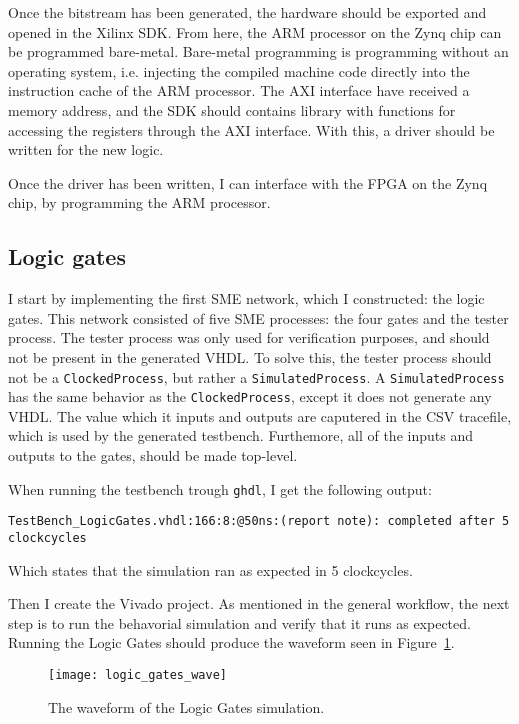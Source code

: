 Once the bitstream has been generated, the hardware should be exported and
opened in the Xilinx SDK. From here, the ARM processor on the Zynq chip can be
programmed bare-metal. Bare-metal programming is programming without an
operating system, i.e. injecting the compiled machine code directly into the
instruction cache of the ARM processor. The AXI interface have received a
memory address, and the SDK should contains library with functions for
accessing the registers through the AXI interface. With this, a driver should
be written for the new logic.

Once the driver has been written, I can interface with the FPGA on the Zynq
chip, by programming the ARM processor.

\subsection{Logic gates}
I start by implementing the first SME network, which I constructed: the logic
gates. This network consisted of five SME processes: the four gates and the
tester process. The tester process was only used for verification purposes, and
should not be present in the generated VHDL. To solve this, the tester process
should not be a \texttt{ClockedProcess}, but rather a
\texttt{SimulatedProcess}. A \texttt{SimulatedProcess} has the same behavior as
the \texttt{ClockedProcess}, except it does not generate any VHDL. The value
which it inputs and outputs are caputered in the CSV tracefile, which is used
by the generated testbench. Furthemore, all of the inputs and outputs to the
gates, should be made top-level.

When running the testbench trough \texttt{ghdl}, I get the following
output:
\begin{lstlisting}
TestBench_LogicGates.vhdl:166:8:@50ns:(report note): completed after 5 clockcycles
\end{lstlisting}
Which states that the simulation ran as expected in 5 clockcycles.

Then I create the Vivado project. As mentioned in the general workflow,
the next step is to run the behavorial simulation and verify that it
runs as expected. Running the Logic Gates should produce the waveform seen in
Figure~\ref{fig:logic-wave}.

\begin{figure}
    \texttt{[image: logic\_gates\_wave]}
    \caption{The waveform of the Logic Gates simulation.}
    \label{fig:logic-wave}
\end{figure}

